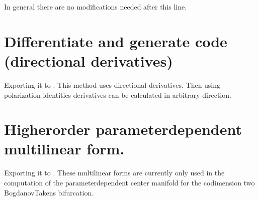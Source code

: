 \documentclass[letterpaper,10pt,english]{jupyterBook}
\begin{document}
\sphinxAtStartPar
In general there are no modifications needed after this line.


\section{Differentiate and generate code (directional derivatives)}
\label{\detokenize{Morris-LecarGenSym:differentiate-and-generate-code-directional-derivatives}}
\sphinxAtStartPar
Exporting it to . This method uses directional derivatives.
Then using polarization identities derivatives can be calculated in arbitrary
direction.

\begin{sphinxVerbatim}[commandchars=\\\{\}]
\PYG{p}{[}\PYG{p}{]}
\end{sphinxVerbatim}


\section{Higher\sphinxhyphen{}order parameter\sphinxhyphen{}dependent multi\sphinxhyphen{}linear form.}
\label{\detokenize{Morris-LecarGenSym:higher-order-parameter-dependent-multi-linear-form}}
\sphinxAtStartPar
Exporting it to . These multi\sphinxhyphen{}linear forms are
currently only used in the computation of the parameter\sphinxhyphen{}dependent center
manifold for the codimension two Bogdanov\sphinxhyphen{}Takens bifurcation.

\begin{sphinxVerbatim}[commandchars=\\\{\}]
\PYG{p}{[}\PYG{p}{]}
\end{sphinxVerbatim}
\end{document}
